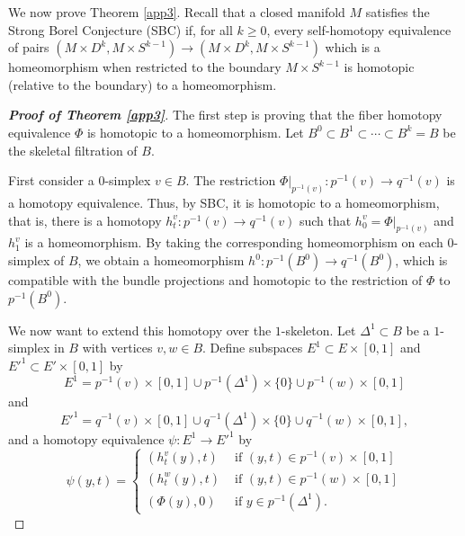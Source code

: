 \documentclass[onecolumn,notitlepage,11pt]{article}
\newcommand{\beq}{\begin{equation*}}
\newcommand{\eeq}{\end{equation*}}
\theoremstyle{definition}
\begin{document}
We now prove Theorem \ref{app3}. Recall that a closed manifold $M$
satisfies the Strong Borel Conjecture (SBC) if, for 
all $k\geq 0$, every self-homotopy equivalence of pairs
$(M\times D^k,M\times S^{k-1})\to (M\times D^k,M\times S^{k-1})$
which is a homeomorphism when restricted to the 
boundary $M\times S^{k-1}$ is
homotopic (relative to the boundary) to a homeomorphism.
\begin{proof}[\textbf{Proof of Theorem \ref{app3}}]
The first step is proving that the fiber homotopy equivalence $\Phi$ is
homotopic to a homeomorphism. Let 
$B^0\subset B^1\subset\cdots\subset B^k=B$ be the skeletal filtration of
$B$. 

First consider a $0$-simplex $v\in B$. The restriction 
$\Phi|_{p^{-1}(v)}:p^{-1}(v)\to q^{-1}(v)$ is a homotopy equivalence.
Thus, by SBC, it is homotopic to a homeomorphism, that is, there is a
homotopy $h_t^v:p^{-1}(v)\to q^{-1}(v)$ such that 
$h_0^v=\Phi|_{p^{-1}(v)}$ and $h_1^v$ is a homeomorphism. 
By taking the corresponding homeomorphism on each $0$-simplex 
of $B$, we obtain a homeomorphism $h^0:p^{-1}(B^0)\to q^{-1}(B^0)$, which
is compatible with the bundle projections and homotopic to the restriction
of $\Phi$ to $p^{-1}(B^0)$.


We now want to extend this homotopy over the $1$-skeleton. Let
$\Delta^1\subset B$ be a $1$-simplex in $B$ with vertices $v,w\in B$. Define
subspaces $E^1\subset E\times [0,1]$ and $E'^1\subset E'\times [0,1]$ by
\beq
E^1=p^{-1}(v)\times [0,1]\cup p^{-1}(\Delta^1)\times\{0\}
\cup p^{-1}(w)\times [0,1]
\eeq
and
\beq
E'^1=q^{-1}(v)\times [0,1]\cup q^{-1}(\Delta^1)\times\{0\}
\cup q^{-1}(w)\times [0,1],
\eeq
and a homotopy equivalence $\psi:E^1\to E'^1$ by
\beq
\psi(y,t)=
\begin{cases}
(h_t^v(y),t)&\text{  if    } (y,t)\in p^{-1}(v)\times [0,1]\\
(h_t^w(y),t)&\text{  if    } (y,t)\in p^{-1}(w)\times [0,1]\\
(\Phi(y),0) &\text{  if    } y\in p^{-1}(\Delta^1).
\end{cases}
\eeq


\end{proof}
\end{document}
